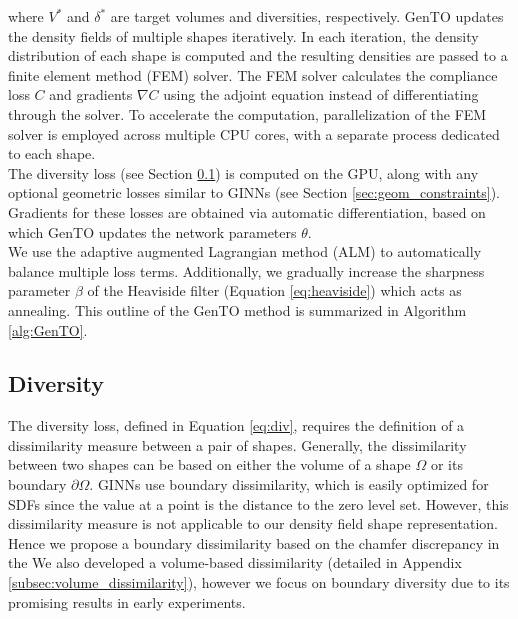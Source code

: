 where $V^*$ and $\delta^*$ are target volumes and diversities, respectively.
GenTO updates the density fields of multiple shapes iteratively. In each iteration, the density distribution of each shape is computed and the resulting densities are passed to a finite element method (FEM) solver. 
The FEM solver calculates the compliance loss $C$ and gradients $\nabla C$ using the adjoint equation instead of differentiating through the solver.
To accelerate the computation, parallelization of the FEM solver is employed across multiple CPU cores, with a separate process dedicated to each shape.
\\ 
The diversity loss (see Section \ref{sec:diversity}) is computed on the GPU, along with any optional geometric losses similar to GINNs (see Section \ref{sec:geom_constraints}).
Gradients for these losses are obtained via automatic differentiation, based on which GenTO updates the network parameters $\theta$.
\\
We use the adaptive augmented Lagrangian method (ALM) \citep{basir2023adaptive} to automatically balance multiple loss terms. 
Additionally, we gradually increase the sharpness parameter $\beta$ of the Heaviside filter (Equation \ref{eq:heaviside}) which acts as annealing. This outline of the GenTO method is summarized in Algorithm \ref{alg:GenTO}.











\subsection{Diversity}
\label{sec:diversity}

The diversity loss, defined in Equation \ref{eq:div}, requires the definition of a dissimilarity measure between a pair of shapes. 
Generally, the dissimilarity between two shapes can be based on either the volume of a shape $\Omega$ or its boundary $\partial \Omega$.
GINNs \citep{GINNs} use boundary dissimilarity, which is easily optimized for SDFs since the value at a point is the distance to the zero level set. However, this dissimilarity measure is not applicable to our density field shape representation.
Hence we propose a boundary dissimilarity based on the chamfer discrepancy in the 
We also developed a volume-based dissimilarity (detailed in Appendix \ref{subsec:volume_dissimilarity}), however we focus on boundary diversity due to its promising results in early experiments.



